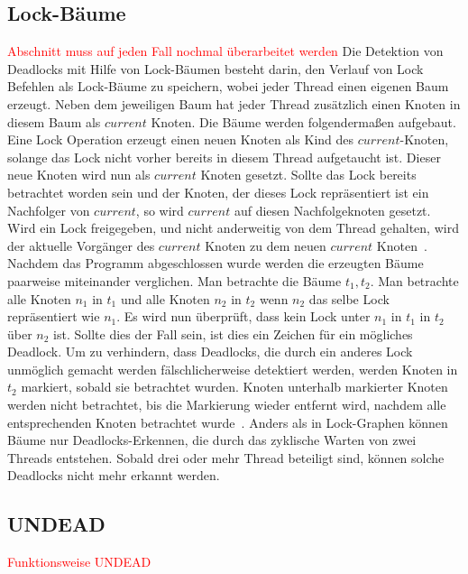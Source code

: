 \subsection{Lock-Bäume}
\textcolor{red}{Abschnitt muss auf jeden Fall nochmal überarbeitet werden}
Die Detektion von Deadlocks mit Hilfe von Lock-Bäumen besteht darin, den 
Verlauf von Lock Befehlen als Lock-Bäume zu speichern, wobei jeder Thread 
einen eigenen Baum erzeugt. Neben dem jeweiligen Baum hat jeder Thread 
zusätzlich einen Knoten in diesem Baum als $current$ Knoten.
Die Bäume werden folgendermaßen aufgebaut. Eine Lock Operation erzeugt einen 
neuen Knoten als Kind des $current$-Knoten, solange das Lock nicht vorher 
bereits in diesem Thread aufgetaucht ist. Dieser neue Knoten wird nun als 
$current$ Knoten gesetzt. Sollte das Lock bereits betrachtet worden sein und 
der Knoten, der dieses Lock repräsentiert ist ein Nachfolger von $current$, so 
wird $current$ auf diesen Nachfolgeknoten gesetzt. Wird ein Lock freigegeben,
und nicht anderweitig von dem Thread gehalten, wird der aktuelle Vorgänger des 
$current$ Knoten zu dem neuen $current$ Knoten~\cite{havelund}.\\
Nachdem das Programm abgeschlossen wurde werden die erzeugten Bäume paarweise 
miteinander verglichen. Man betrachte die Bäume $t_1, t_2$. Man betrachte 
alle Knoten $n_1$ in $t_1$ und alle Knoten $n_2$ in $t_2$ wenn $n_2$ das selbe 
Lock repräsentiert wie $n_1$. Es wird nun überprüft, dass kein Lock unter $n_1$
in $t_1$ in $t_2$ über $n_2$ ist. Sollte dies der Fall sein, ist dies ein Zeichen 
für ein mögliches Deadlock. Um zu verhindern, dass Deadlocks, die durch ein 
anderes Lock unmöglich gemacht werden fälschlicherweise detektiert werden,
werden Knoten in $t_2$ markiert, sobald sie betrachtet wurden. Knoten unterhalb
markierter Knoten werden nicht betrachtet, bis die Markierung wieder entfernt wird,
nachdem alle entsprechenden Knoten betrachtet wurde~\cite{havelund}.
Anders als in Lock-Graphen können Bäume nur Deadlocks-Erkennen, die durch das 
zyklische Warten von zwei Threads entstehen. Sobald drei oder mehr Thread beteiligt
sind, können solche Deadlocks nicht mehr erkannt werden.



\subsection{UNDEAD}
\textcolor{red}{Funktionsweise UNDEAD}
